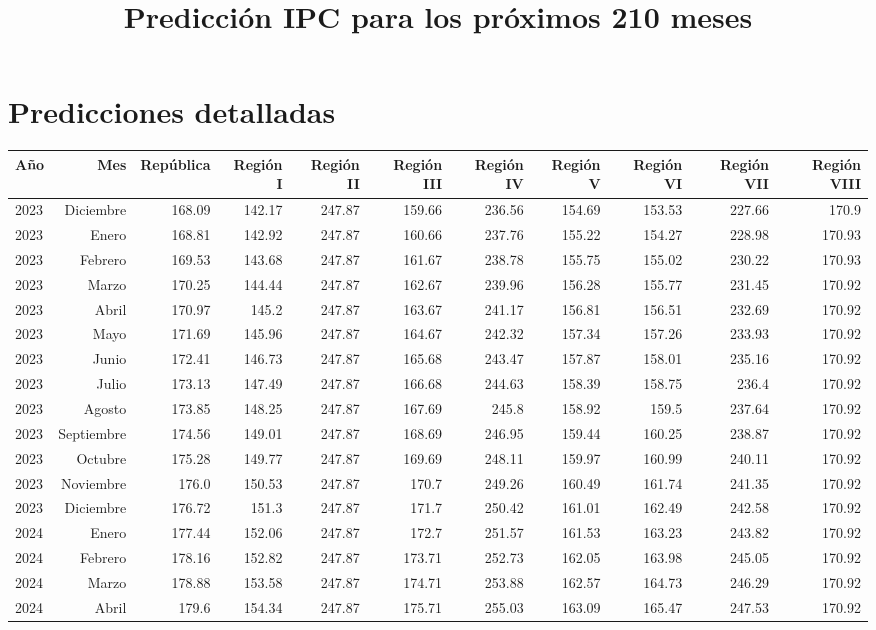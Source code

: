 \documentclass{article}%
\title{Predicción IPC para los próximos 210 meses}%
\date{}%
\begin{document}
%
\normalsize%
\maketitle%
\section*{Predicciones detalladas}%
\label{sec:Prediccionesdetalladas}%
\begin{longtable}{|l r|r|r|r|r|r|r|r|r|r|}%
\hline%
Año&Mes&República&Región I&Región II&Región III&Región IV&Región V&Región VI&Región VII&Región VIII\\%
\hline%
2023&Diciembre&168.09&142.17&247.87&159.66&236.56&154.69&153.53&227.66&170.9\\%
2023&Enero&168.81&142.92&247.87&160.66&237.76&155.22&154.27&228.98&170.93\\%
2023&Febrero&169.53&143.68&247.87&161.67&238.78&155.75&155.02&230.22&170.93\\%
2023&Marzo&170.25&144.44&247.87&162.67&239.96&156.28&155.77&231.45&170.92\\%
2023&Abril&170.97&145.2&247.87&163.67&241.17&156.81&156.51&232.69&170.92\\%
2023&Mayo&171.69&145.96&247.87&164.67&242.32&157.34&157.26&233.93&170.92\\%
2023&Junio&172.41&146.73&247.87&165.68&243.47&157.87&158.01&235.16&170.92\\%
2023&Julio&173.13&147.49&247.87&166.68&244.63&158.39&158.75&236.4&170.92\\%
2023&Agosto&173.85&148.25&247.87&167.69&245.8&158.92&159.5&237.64&170.92\\%
2023&Septiembre&174.56&149.01&247.87&168.69&246.95&159.44&160.25&238.87&170.92\\%
2023&Octubre&175.28&149.77&247.87&169.69&248.11&159.97&160.99&240.11&170.92\\%
2023&Noviembre&176.0&150.53&247.87&170.7&249.26&160.49&161.74&241.35&170.92\\%
2023&Diciembre&176.72&151.3&247.87&171.7&250.42&161.01&162.49&242.58&170.92\\%
2024&Enero&177.44&152.06&247.87&172.7&251.57&161.53&163.23&243.82&170.92\\%
2024&Febrero&178.16&152.82&247.87&173.71&252.73&162.05&163.98&245.05&170.92\\%
2024&Marzo&178.88&153.58&247.87&174.71&253.88&162.57&164.73&246.29&170.92\\%
2024&Abril&179.6&154.34&247.87&175.71&255.03&163.09&165.47&247.53&170.92\\%

\end{longtable}
\end{document}

